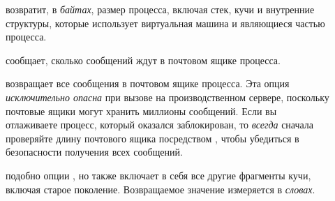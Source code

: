 \begin{description*}
\begin{description}
	\item[] возвратит, в \emph{байтах}, размер процесса, включая стек, кучи и внутренние структуры, которые использует виртуальная машина и являющиеся частью процесса.

	\item[] сообщает, сколько сообщений ждут в почтовом ящике процесса.

	\item[] возвращает все сообщения в почтовом ящике процесса. Эта опция \emph{исключительно опасна} при вызове на производственном сервере, поскольку почтовые ящики могут хранить миллионы сообщений. Если вы отлаживаете процесс, который оказался заблокирован, то \emph{всегда} сначала проверяйте длину почтового ящика  посредством , чтобы убедиться в безопасности получения всех сообщений.

	\item[] подобно опции , но также включает в себя все другие фрагменты кучи, включая старое поколение. Возвращаемое значение измеряется в \emph{словах}.
	\end{description}
	

\end{description*}
